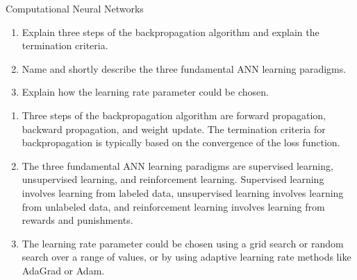 \documentclass{article}
\begin{document}
\begin{exercise}{Computational Neural Networks}
  \begin{enumerate}
    \item Explain three steps of the backpropagation algorithm and explain the termination criteria.
    \item Name and shortly describe the three fundamental ANN learning paradigms.
    \item Explain how the learning rate parameter could be chosen.
  \end{enumerate}

  \begin{solution}
    \begin{enumerate}
      \item Three steps of the backpropagation algorithm are forward propagation, backward propagation, and weight update. The termination criteria for backpropagation is typically based on the convergence of the loss function.
      \item The three fundamental ANN learning paradigms are supervised learning, unsupervised learning, and reinforcement learning. Supervised learning involves learning from labeled data, unsupervised learning involves learning from unlabeled data, and reinforcement learning involves learning from rewards and punishments.
      \item The learning rate parameter could be chosen using a grid search or random search over a range of values, or by using adaptive learning rate methods like AdaGrad or Adam.
    \end{enumerate}
  \end{solution}
\end{exercise}
\end{document}
